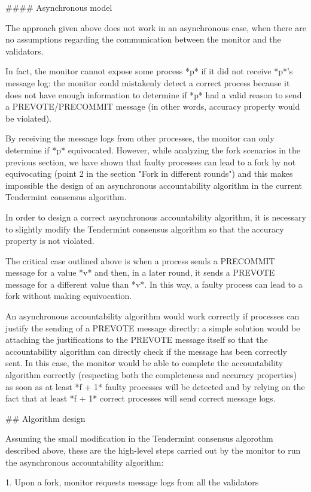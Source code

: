 \documentclass[a4paper,11pt,oneside]{report}
\begin{document}
\begin{markdown}
#### Asynchronous model

The approach given above does not work in an asynchronous case, when there are no assumptions regarding the communication between the monitor and the validators. 

In fact, the monitor cannot expose some process *p* if it did not receive *p*'s message log: the monitor could mistakenly detect a correct process because it does not have enough information to determine if *p* had a valid reason to send a PREVOTE/PRECOMMIT message (in other words, accuracy property would be violated).
 
By receiving the message logs from other processes, the monitor can only determine if *p* equivocated. 
However, while analyzing the fork scenarios in the previous section, we have shown that faulty processes can lead to a fork by not equivocating (point 2 in the section "Fork in different rounds") and this makes impossible the design of an asynchronous accountability algorithm in the current Tendermint consensus algorithm.  

In order to design a correct asynchronous accountability algorithm, it is necessary to slightly modify the Tendermint consensus algorithm so that the accuracy property is not violated.

The critical case outlined above is when a process sends a PRECOMMIT message for a value *v* and then, in a later round, it sends a PREVOTE message for a different value than *v*. In this way, a faulty process can lead to a fork without making equivocation.

An asynchronous accountability algorithm would work correctly if processes can justify the sending of a PREVOTE message directly: a simple solution would be attaching the justifications to the PREVOTE message itself so that the accountability algorithm can directly check if the message has been correctly sent.
In this case, the monitor would be able to complete the accountability algorithm correctly (respecting both the completeness and accuracy properties) as soon as at least *f + 1* faulty processes will be detected and by relying on the fact that at least *f + 1* correct processes will send correct message logs.

## Algorithm design
 
Assuming the small modification in the Tendermint consensus algorothm described above, these are the high-level steps carried out by the monitor to run the asynchronous accountability algorithm:

1. Upon a fork, monitor requests message logs from all the validators


\end{markdown}
\end{document}
